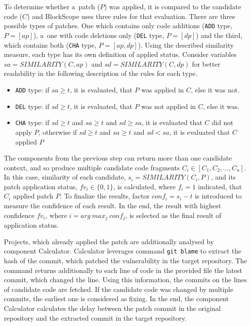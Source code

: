     To determine whether a~patch ($P$) was applied, it is compared to the candidate code ($C$) and BlockScope uses three
    rules for that evaluation. There are three possible types of patches. One which contains only code additions (\texttt{ADD} type,
    $P = [ap]$), a~one with code deletions only (\texttt{DEL} type, $P = [dp]$) and the third, which contains both
    (\texttt{CHA} type, $P = [ap, dp]$). Using the described similarity measure, each type has its own definition of applied status.
    Consider variables $sa = SIMILARITY(C, ap)$ and $sd = SIMILARITY(C, dp)$ for better readability in the following description
    of the rules for each type.
    \begin{itemize}
        \item \texttt{ADD} type: if $sa \geq t$, it is evaluated, that $P$ was applied in $C$, else it was not.
        \item \texttt{DEL} type: if $sd \geq t$, it is evaluated, that $P$ was not applied in $C$, else it was.
        \item \texttt{CHA} type: if $sd \geq t$ and $sa \geq t$ and $sd \geq sa$, it is evaluated that $C$ did not apply $P$,
              otherwise if $sd \geq t$ and $sa \geq t$ and $sd < sa$, it is evaluated that $C$ applied $P$
    \end{itemize}

    The components from the previous step can return more than one candidate context, and so produce multiple candidate
    code fragments $C_i \in [C_1, C_2, ..., C_n]$. In this case, similarity of each candidate, $s_i = SIMILARITY(C_i, P)$,
    and its patch application status, $fv_i \in \{0, 1\}$, is calculated, where $f_i = 1$ indicated, that $C_i$ applied patch $P$.
    To finalize the results, factor $conf_i = s_i - t$ is introduced to measure the confidence of each result. In the end,
    the result with highest confidence $fv_i$, where $i = arg\ max_j\ conf_j$, is selected as the final result of application
    status.

    Projects, which already applied the patch are additionally analysed by component Calculator. Calculator leverages
    command \texttt{git blame} to extract the hash of the commit, which patched the vulnerability in the target repository.
    The command returns additionally to each line of code in the provided file the latest commit, which changed the line.
    Using this information, the commits on the lines of candidate code are fetched. If the candidate code was changed
    by multiple commits, the earliest one is considered as fixing. In the end, the component Calculator calculates
    the delay between the patch commit in the original repository and the extracted commit in the target repository.

